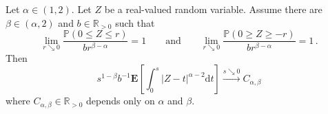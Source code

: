 \documentclass{article}
\newcommand{\R}{\mathbb{R}}
\newcommand{\Rpp}{\R_{>0}}
\newcommand{\lab}{\left[} %
\newcommand{\rab}{\right]} %
\newcommand{\ab}[1]{\lab #1 \rab} %
\newcommand{\abOf}[1]{\!\ab{#1}} %
\newcommand{\E}{\mathbf{E}} %
\newcommand{\EOf}[1]{\E\abOf{#1}}
\newcommand{\eqfs}{\,.}
\newcommand{\dl}{\mathrm{d}} %
\begin{document}
\begin{lemma}\label{lmm:alpha:fast:secondderiv}
    Let $\alpha\in(1,2)$. Let $Z$ be a real-valued random variable.
    Assume there are $\beta\in(\alpha,2)$ and $b\in\Rpp$ such that
    \begin{equation}\label{eq:alpha:fast:largesmallball}
        \lim_{r\searrow 0}\frac{\mathbb{P}(0\le Z\le r)}{b r^{\beta-\alpha}} = 1
        \qquad\text{and}\qquad
        \lim_{r\searrow 0}\frac{\mathbb{P}(0\ge Z\ge -r)}{b r^{\beta-\alpha}} = 1
        \eqfs
    \end{equation}
    Then
    \begin{equation}
        s^{1-\beta} b^{-1}
        \EOf{\int_0^s |Z-t|^{\alpha-2} \dl t}
        \xrightarrow{s\searrow 0}
        C_{\alpha,\beta}
    \end{equation}
    where $C_{\alpha,\beta} \in\Rpp$ depends only on $\alpha$ and $\beta$.
\end{lemma}
\end{document}
